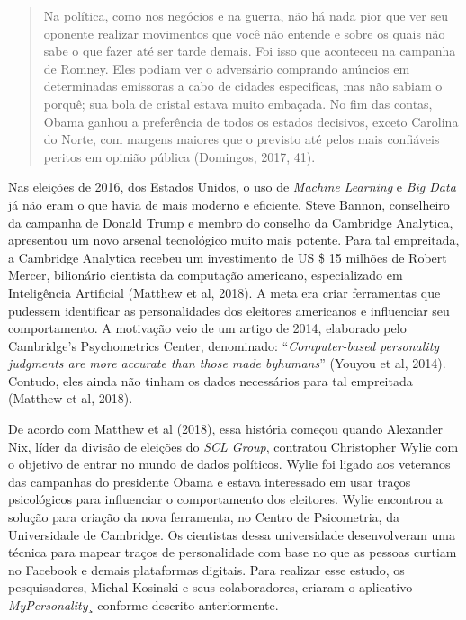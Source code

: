 \begin{quote}
Na política, como nos negócios e na guerra, não há nada pior que ver seu
oponente realizar movimentos que você não entende e sobre os quais não
sabe o que fazer até ser tarde demais. Foi isso que aconteceu na
campanha de Romney. Eles podiam ver o adversário comprando anúncios em
determinadas emissoras a cabo de cidades especificas, mas não sabiam o
porquê; sua bola de cristal estava muito embaçada. No fim das contas,
Obama ganhou a preferência de todos os estados decisivos, exceto
Carolina do Norte, com margens maiores que o previsto até pelos mais
confiáveis peritos em opinião pública (Domingos, 2017, 41).
\end{quote}

Nas eleições de 2016, dos Estados Unidos, o uso de \emph{Machine
Learning} e \emph{Big Data} já não eram o que havia de mais moderno e
eficiente. Steve Bannon, conselheiro da campanha de Donald Trump e
membro do conselho da Cambridge Analytica, apresentou um novo arsenal
tecnológico muito mais potente. Para tal empreitada, a Cambridge
Analytica recebeu um investimento de US \$ 15 milhões de Robert Mercer,
bilionário cientista da computação americano, especializado em
Inteligência Artificial (Matthew et al, 2018). A meta era criar
ferramentas que pudessem identificar as personalidades dos eleitores
americanos e influenciar seu comportamento. A motivação veio de um
artigo de 2014, elaborado pelo Cambridge's Psychometrics Center,
denominado: ``\emph{Computer-based personality judgments are more
accurate than those made byhumans}'' (Youyou et al, 2014). Contudo, eles
ainda não tinham os dados necessários para tal empreitada (Matthew et
al, 2018).

De acordo com Matthew et al (2018), essa história começou quando
Alexander Nix, líder da divisão de eleições do \emph{SCL Group},
contratou Christopher Wylie com o objetivo de entrar no mundo de dados
políticos. Wylie foi ligado aos veteranos das campanhas do presidente
Obama e estava interessado em usar traços psicológicos para influenciar
o comportamento dos eleitores. Wylie encontrou a solução para criação da
nova ferramenta, no Centro de Psicometria, da Universidade de Cambridge.
Os cientistas dessa universidade desenvolveram uma técnica para mapear
traços de personalidade com base no que as pessoas curtiam no Facebook e
demais plataformas digitais. Para realizar esse estudo, os
pesquisadores, Michal Kosinski e seus colaboradores, criaram o
aplicativo \emph{MyPersonality}¸ conforme descrito anteriormente.

